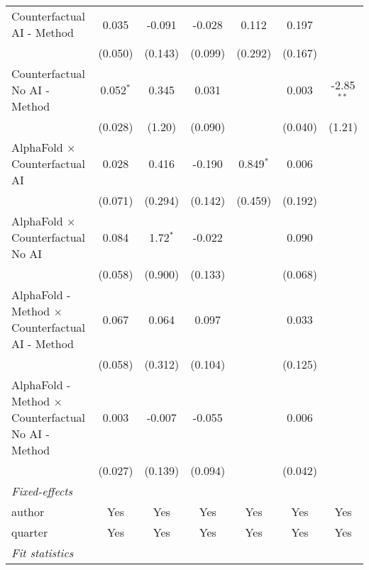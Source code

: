 \begin{tabular}{lcccccc}
   Counterfactual AI - Method                                 & 0.035       & -0.091     & -0.028  & 0.112        & 0.197   &   \\   
                                                              & (0.050)     & (0.143)    & (0.099) & (0.292)      & (0.167) &   \\   
   Counterfactual No AI - Method                              & 0.052$^{*}$ & 0.345      & 0.031   &              & 0.003   & -2.85$^{**}$\\   
                                                              & (0.028)     & (1.20)     & (0.090) &              & (0.040) & (1.21)\\   
   AlphaFold $\times$ Counterfactual AI                       & 0.028       & 0.416      & -0.190  & 0.849$^{*}$  & 0.006   &   \\   
                                                              & (0.071)     & (0.294)    & (0.142) & (0.459)      & (0.192) &   \\   
   AlphaFold $\times$ Counterfactual No AI                    & 0.084       & 1.72$^{*}$ & -0.022  &              & 0.090   &   \\   
                                                              & (0.058)     & (0.900)    & (0.133) &              & (0.068) &   \\   
   AlphaFold - Method $\times$ Counterfactual AI - Method     & 0.067       & 0.064      & 0.097   &              & 0.033   &   \\   
                                                              & (0.058)     & (0.312)    & (0.104) &              & (0.125) &   \\   
   AlphaFold - Method $\times$ Counterfactual No AI - Method  & 0.003       & -0.007     & -0.055  &              & 0.006   &   \\   
                                                              & (0.027)     & (0.139)    & (0.094) &              & (0.042) &   \\   
   \midrule
   \emph{Fixed-effects}\\
   author                                                     & Yes         & Yes        & Yes     & Yes          & Yes     & Yes\\  
   quarter                                                    & Yes         & Yes        & Yes     & Yes          & Yes     & Yes\\  
   \midrule
   \emph{Fit statistics}\\

\end{tabular}

